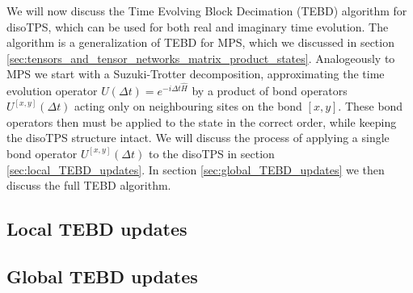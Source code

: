 We will now discuss the Time Evolving Block Decimation (TEBD) algorithm for disoTPS, which can be used for both real and imaginary time evolution. The algorithm is a generalization of TEBD for MPS, which we discussed in section \ref{sec:tensors_and_tensor_networks_matrix_product_states}. Analogeously to MPS we start with a Suzuki-Trotter decomposition, approximating the time evolution operator $U\left(\Delta t\right) = e^{-i\Delta t \hat{H}}$ by a product of bond operators $U^{[x, y]}\left(\Delta t\right)$ acting only on neighbouring sites on the bond $[x, y]$. These bond operators then must be applied to the state in the correct order, while keeping the disoTPS structure intact. We will discuss the process of applying a single bond operator $U^{[x,y]}\left(\Delta t\right)$ to the disoTPS in section \ref{sec:local_TEBD_updates}. In section \ref{sec:global_TEBD_updates} we then discuss the full TEBD algorithm.

\subsection{Local TEBD updates}
\label{sec:disoTPS_TEBD_local_updates}


\subsection{Global TEBD updates}
\label{sec:disoTPS_TEBD_global_updates}
